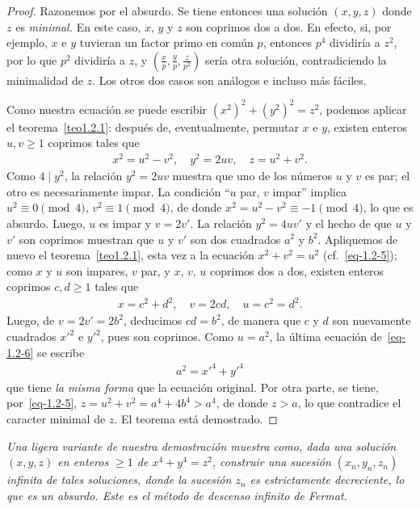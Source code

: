 \documentclass[10pt,oneside,bibtotoc,smallheadings,leqno,a5paper,DIV=12]{scrbook}
\numberwithin{equation}{section}
\newenvironment{comm}%
	{\begin{trivlist}\item\small\itshape}
	{\end{trivlist}}
\theoremstyle{defi}
\theoremstyle{enonce}
\theoremstyle{rem}
\numberwithin{theorem}{section}
\numberwithin{proposition}{section}
\numberwithin{definition}{section}
\numberwithin{lemma}{section}
\numberwithin{corollary}{section}
\numberwithin{example}{section}
\numberwithin{footnote}{section}%
\begin{document}
\begin{proof}
Razonemos por el absurdo. Se tiene entonces una soluci\'on $(x,y,z)$ donde $z$ es {\em minimal.}
En este caso, $x$, $y$ y $z$ son coprimos dos a dos. En efecto, si, por ejemplo, $x$ e $y$ tuvieran
un factor primo en com\'un $p$, entonces $p^{4}$ dividir\'ia a $z^{2}$, por lo que $p^{2}$ dividir\'ia
a $z$, y $\left(\frac{x}{p},\frac{y}{p},\frac{z}{p^{2}}\right)$ ser\'ia otra soluci\'on, contradiciendo
la minimalidad de $z$. Los otros dos casos son an\'alogos e incluso m\'as f\'aciles.

Como nuestra
ecuaci\'on se puede escribir $(x^{2})^{2}+(y^{2})^{2}=z^{2}$, podemos aplicar el teorema~\ref{teo1.2.1}: despu\'es
de, eventualmente, permutar $x$ e $y$, existen enteros $u, v\geq 1$ coprimos tales que
\begin{gather}\label{eq-1.2-5}
x^{2} = u^{2}-v^{2},\quad y^{2} = 2uv,\quad z = u^{2}+v^{2}.
\end{gather}
Como $4\mid y^{2}$, la relaci\'on $y^{2} = 2uv$ muestra que uno de los n\'umeros $u$ y $v$ es
par; el otro es necesariamente impar. La condici\'on ``$u$ par, $v$ impar'' implica
$u^{2}\equiv 0\pmod 4$, $v^{2}\equiv 1\pmod 4$, de donde $x^{2}=u^{2}-v^{2}\equiv -1\pmod 4$,
lo que es absurdo. Luego, $u$ es impar y $v = 2v'$. La relaci\'on $y^{2} = 4uv'$ y el hecho
de que $u$ y $v'$ son coprimos muestran que $u$ y $v'$ son dos cuadrados $a^{2}$ y $b^{2}$.
Apliquemos de nuevo el teorema~\ref{teo1.2.1}, esta vez a la ecuaci\'on $x^{2}+v^{2} = u^{2}$ (cf.~\eqref{eq-1.2-5});
como $x$ y $u$ son impares, $v$ par, y $x$, $v$, $u$ coprimos dos a dos, existen enteros coprimos
$c,d\geq 1$ tales que
\begin{gather}\label{eq-1.2-6}
x = c^{2}+d^{2},\quad v = 2cd,\quad u=c^{2}=d^{2}.
\end{gather}
Luego, de $v = 2v' = 2b^{2}$, deducimos $cd = b^{2}$, de manera que $c$ y $d$ son nuevamente
cuadrados $x'^{2}$ e $y'^{2}$, pues son coprimos. Como $u=a^{2}$, la \'ultima ecuaci\'on de~\eqref{eq-1.2-6}
se escribe
\begin{gather}
a^{2} = x'^{4}+y'^{4}
\end{gather}
que tiene {\em la misma forma} que la ecuaci\'on original. Por otra parte, se tiene, por~\eqref{eq-1.2-5},
$z = u^{2}+v^{2} = a^{4}+4b^{4} > a^{4}$, de donde $z > a$, lo que contradice el caracter minimal
de $z$. El teorema est\'a demostrado.
\end{proof}

\begin{comm}
Una ligera variante de nuestra demostraci\'on muestra como, dada una soluci\'on $(x,y,z)$
en enteros $\geq 1$ de $x^{4}+y^{4}=z^{2}$, construir una sucesi\'on $(x_{n},y_{n},z_{n})$
infinita de tales soluciones, donde la sucesi\'on $z_{n}$ es estrictamente decreciente, lo
que es un absurdo. Este es el m\'etodo de {\em descenso infinito} de Fermat.
\end{comm}
\end{document}
